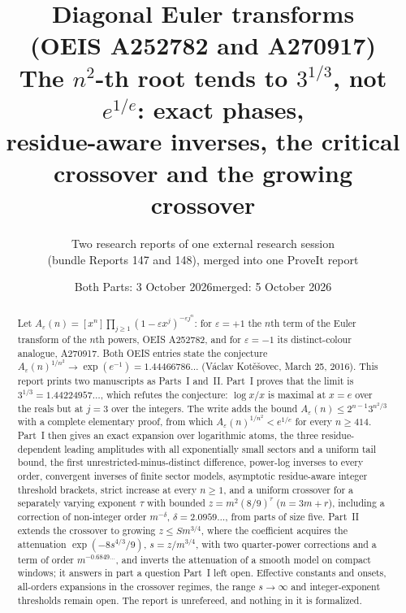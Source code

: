 \documentclass[11pt,letterpaper]{article}
\title{\textbf{Diagonal Euler transforms\\ (OEIS A252782 and A270917)}\\[7pt]
\large The $n^2$-th root tends to $3^{1/3}$, not $e^{1/e}$: exact phases,\\ residue-aware inverses, the critical crossover and the growing crossover}
\author{Two research reports of one external research session\\(bundle Reports 147 and 148), merged into one ProveIt report}
\date{Both Parts: 3 October 2026\quad merged: 5 October 2026}
\numberwithin{equation}{section}
\theoremstyle{definition}\newtheorem{definition}[theorem]{Definition}
\theoremstyle{remark}\newtheorem{remark}[theorem]{Remark}
\newcommand{\eps}{\varepsilon}
\begin{document}
\hypersetup{pageanchor=false}
\maketitle
\begin{abstract}
Let $A_\eps(n)=[x^n]\prod_{j\ge1}(1-\eps x^j)^{-\eps j^n}$: for $\eps=+1$ the $n$th term of the Euler transform of the $n$th powers, OEIS A252782, and for $\eps=-1$ its distinct-colour analogue, A270917. Both OEIS entries state the conjecture $A_\eps(n)^{1/n^2}\to\exp(e^{-1})=1.44466786\ldots$ (V\'aclav Kot\v{e}\v{s}ovec, March 25, 2016). This report prints two manuscripts as Parts~I and~II. Part~I proves that the limit is $3^{1/3}=1.44224957\ldots$, which refutes the conjecture: $\log x/x$ is maximal at $x=e$ over the reals but at $j=3$ over the integers. The write adds the bound $A_\eps(n)\le2^{n-1}3^{n^2/3}$ with a complete elementary proof, from which $A_\eps(n)^{1/n^2}<e^{1/e}$ for every $n\ge414$. Part~I then gives an exact expansion over logarithmic atoms, the three residue-dependent leading amplitudes with all exponentially small sectors and a uniform tail bound, the first unrestricted-minus-distinct difference, power-log inverses to every order, convergent inverses of finite sector models, asymptotic residue-aware integer threshold brackets, strict increase at every $n\ge1$, and a uniform crossover for a separately varying exponent $\tau$ with bounded $z=m^2(8/9)^\tau$ ($n=3m+r$), including a correction of non-integer order $m^{-\delta}$, $\delta=2.0959\ldots$, from parts of size five. Part~II extends the crossover to growing $z\le Sm^{3/4}$, where the coefficient acquires the attenuation $\exp(-8s^{4/3}/9)$, $s=z/m^{3/4}$, with two quarter-power corrections and a term of order $m^{-0.6849\ldots}$, and inverts the attenuation of a smooth model on compact windows; it answers in part a question Part~I left open. Effective constants and onsets, all-orders expansions in the crossover regimes, the range $s\to\infty$ and integer-exponent thresholds remain open. The report is unrefereed, and nothing in it is formalized.
\end{abstract}
\hypersetup{pageanchor=true}
\setcounter{tocdepth}{1}
{\small\setlength{\parskip}{0pt}\tableofcontents}
\newpage
\end{document}
